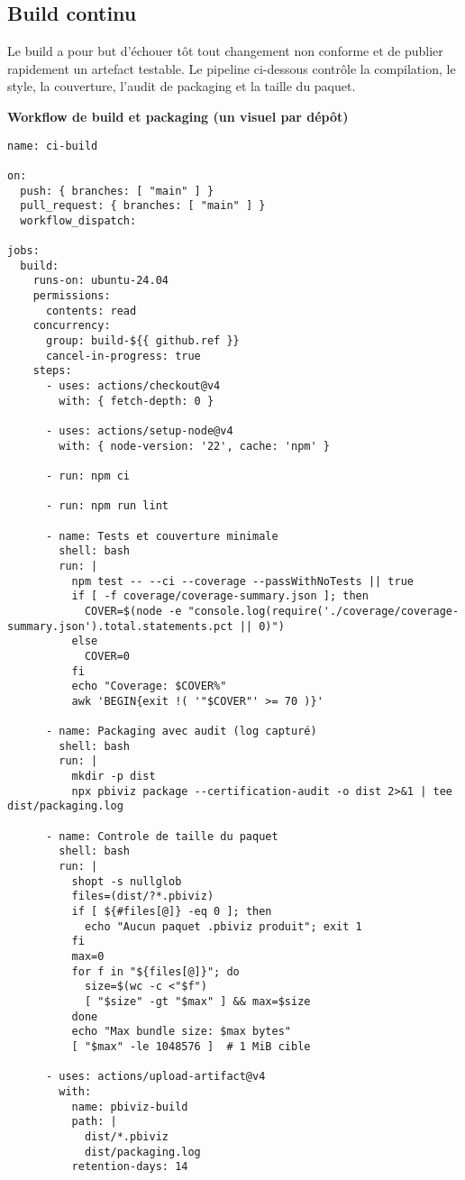\subsection{Build continu}
\label{subsec:ci-build}

Le build a pour but d’échouer tôt tout changement non conforme et de publier rapidement un artefact testable. Le pipeline ci-dessous contrôle la compilation, le style, la couverture, l’audit de packaging et la taille du paquet.

\noindent\textbf{Workflow de build et packaging (un visuel par dépôt)}
\begin{verbatim}
name: ci-build

on:
  push: { branches: [ "main" ] }
  pull_request: { branches: [ "main" ] }
  workflow_dispatch:

jobs:
  build:
    runs-on: ubuntu-24.04
    permissions:
      contents: read
    concurrency:
      group: build-${{ github.ref }}
      cancel-in-progress: true
    steps:
      - uses: actions/checkout@v4
        with: { fetch-depth: 0 }

      - uses: actions/setup-node@v4
        with: { node-version: '22', cache: 'npm' }

      - run: npm ci

      - run: npm run lint

      - name: Tests et couverture minimale
        shell: bash
        run: |
          npm test -- --ci --coverage --passWithNoTests || true
          if [ -f coverage/coverage-summary.json ]; then
            COVER=$(node -e "console.log(require('./coverage/coverage-summary.json').total.statements.pct || 0)")
          else
            COVER=0
          fi
          echo "Coverage: $COVER%"
          awk 'BEGIN{exit !( '"$COVER"' >= 70 )}'

      - name: Packaging avec audit (log capturé)
        shell: bash
        run: |
          mkdir -p dist
          npx pbiviz package --certification-audit -o dist 2>&1 | tee dist/packaging.log

      - name: Controle de taille du paquet
        shell: bash
        run: |
          shopt -s nullglob
          files=(dist/?*.pbiviz)
          if [ ${#files[@]} -eq 0 ]; then
            echo "Aucun paquet .pbiviz produit"; exit 1
          fi
          max=0
          for f in "${files[@]}"; do
            size=$(wc -c <"$f")
            [ "$size" -gt "$max" ] && max=$size
          done
          echo "Max bundle size: $max bytes"
          [ "$max" -le 1048576 ]  # 1 MiB cible

      - uses: actions/upload-artifact@v4
        with:
          name: pbiviz-build
          path: |
            dist/*.pbiviz
            dist/packaging.log
          retention-days: 14
\end{verbatim}

